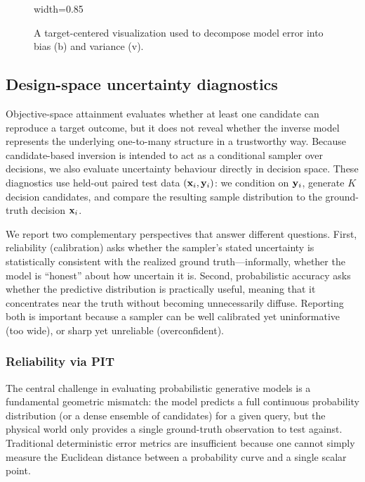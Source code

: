 \begin{figure}[!htbp]
  \centering
  \begin{adjustbox}{width=0.85\linewidth}
      
  \end{adjustbox}
  \caption[Diagnostic Framework for Candidate-Cloud Geometry]{A target-centered visualization used to decompose model error into bias (b) and variance (v).}
  \label{fig:residuals_space}
\end{figure}


\subsection{Design-space uncertainty diagnostics}\label{sec:eval_design}

Objective-space attainment evaluates whether at least one candidate can reproduce a target
outcome, but it does not reveal whether the inverse model represents the underlying
one-to-many structure in a trustworthy way. Because candidate-based inversion is intended
to act as a conditional sampler over decisions, we also evaluate uncertainty behaviour
directly in decision space. These diagnostics use held-out paired test data
$(\mathbf{x}_i,\mathbf{y}_i)$: we condition on $\mathbf{y}_i$, generate $K$ decision candidates, and
compare the resulting sample distribution to the ground-truth decision $\mathbf{x}_i$.

We report two complementary perspectives that answer different questions.
First, reliability (calibration) asks whether the sampler’s stated uncertainty is
statistically consistent with the realized ground truth---informally, whether the model is
``honest'' about how uncertain it is. Second, probabilistic accuracy asks whether the
predictive distribution is practically useful, meaning that it concentrates near the truth
without becoming unnecessarily diffuse. Reporting both is important because a sampler can
be well calibrated yet uninformative (too wide), or sharp yet unreliable (overconfident).


\subsubsection{Reliability via PIT}\label{sec:eval_pit}

The central challenge in evaluating probabilistic generative models is a fundamental geometric mismatch: the model predicts a full continuous probability distribution (or a dense ensemble of candidates) for a given query, but the physical world only provides a single ground-truth observation to test against. Traditional deterministic error metrics are insufficient because one cannot simply measure the Euclidean distance between a probability curve and a single scalar point. 

